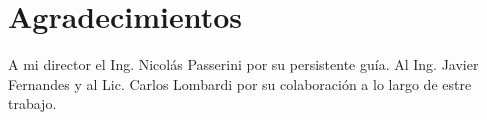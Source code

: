 
\section{Agradecimientos}

A mi director el Ing. Nicolás Passerini por su persistente guía. Al Ing. Javier Fernandes y al Lic. 
Carlos Lombardi por su colaboración a lo largo de estre trabajo. 
